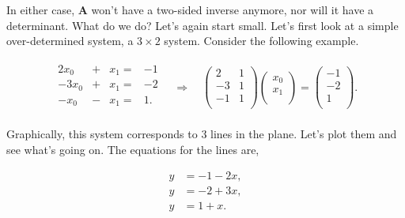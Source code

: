 \documentclass[
  letterpaper,
  DIV=11,
  numbers=noendperiod]{scrreprt}
\begin{document}
In either case, \(\mathbf{A}\) won't have a two-sided inverse anymore,
nor will it have a determinant. What do we do? Let's again start small.
Let's first look at a simple over-determined system, a \(3 \times 2\)
system. Consider the following example.

\begin{gather*}
\begin{alignedat}{3}
   2x_0 & {}+{} &  x_1 {}={} & -1 \\
   -3x_0 & {}+{} &  x_1 {}={} & -2 \\
   -x_0 & {}-{} &  x_1 {}={} & 1. \\
\end{alignedat}
\quad \Longrightarrow \quad
\begin{pmatrix}
2 & 1 \\
-3 & 1 \\
-1 & 1 \\
\end{pmatrix}
\begin{pmatrix}
x_0 \\
x_1 \\
\end{pmatrix} = 
\begin{pmatrix}
-1 \\
-2 \\
1 \\
\end{pmatrix}.
\end{gather*}

Graphically, this system corresponds to 3 lines in the plane. Let's plot
them and see what's going on. The equations for the lines are,

\begin{align*}
y &= -1 - 2x, \\
y &= -2 + 3x, \\
y &= 1 + x. \\
\end{align*}
\end{document}
